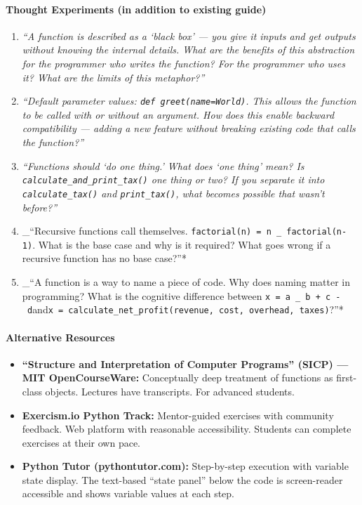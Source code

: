 \documentclass[
  justified,
  openright,
]{tufte-book}
\let\subsubsection\paragraph
\let\paragraph\paragraph
\let\subsubsection\paragraph
\let\paragraph\paragraph
\providecommand{\tightlist}{%
  \setlength{\itemsep}{0pt}\setlength{\parskip}{0pt}}
\begin{document}
\subsubsection{Thought Experiments (in addition to existing
guide)}\label{thought-experiments-in-addition-to-existing-guide}

\begin{enumerate}
\def\labelenumi{\arabic{enumi}.}
\item
  \emph{``A function is described as a `black box' --- you give it
  inputs and get outputs without knowing the internal details. What are
  the benefits of this abstraction for the programmer who writes the
  function? For the programmer who uses it? What are the limits of this
  metaphor?''}
\item
  \emph{``Default parameter values:
  \texttt{def\ greet(name=\textquotesingle{}World\textquotesingle{})}.
  This allows the function to be called with or without an argument. How
  does this enable backward compatibility --- adding a new feature
  without breaking existing code that calls the function?''}
\item
  \emph{``Functions should `do one thing.' What does `one thing' mean?
  Is \texttt{calculate\_and\_print\_tax()} one thing or two? If you
  separate it into \texttt{calculate\_tax()} and \texttt{print\_tax()},
  what becomes possible that wasn't before?''}
\item
  \_``Recursive functions call themselves.
  \texttt{factorial(n)\ =\ n\ \_\ factorial(n-1)}. What is the base case
  and why is it required? What goes wrong if a recursive function has no
  base case?''*
\item
  \_``A function is a way to name a piece of code. Why does naming
  matter in programming? What is the cognitive difference between
  \texttt{x\ =\ a\ \_\ b\ +\ c\ -\ d}and\texttt{x\ =\ calculate\_net\_profit(revenue,\ cost,\ overhead,\ taxes)}?''*
\end{enumerate}

\paragraph{Alternative Resources}\label{alternative-resources-4}

\begin{itemize}
\tightlist
\item
  \textbf{``Structure and Interpretation of Computer Programs'' (SICP)
  --- MIT OpenCourseWare:} Conceptually deep treatment of functions as
  first-class objects. Lectures have transcripts. For advanced students.
\item
  \textbf{Exercism.io Python Track:} Mentor-guided exercises with
  community feedback. Web platform with reasonable accessibility.
  Students can complete exercises at their own pace.
\item
  \textbf{Python Tutor (pythontutor.com):} Step-by-step execution with
  variable state display. The text-based ``state panel'' below the code
  is screen-reader accessible and shows variable values at each step.
\end{itemize}
\end{document}
